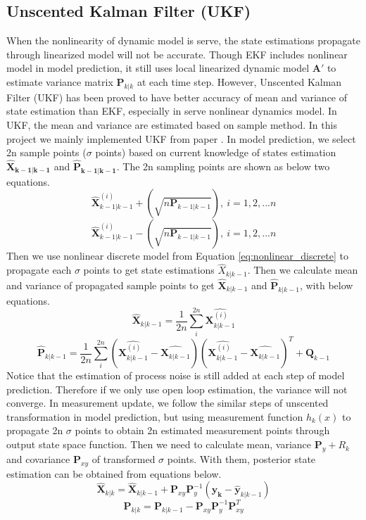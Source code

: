 \documentclass{article}
\newcommand{\matr}[1]{\bm{#1}}     %
\begin{document}
\subsection{Unscented Kalman Filter (UKF)}
When the nonlinearity of dynamic model is serve, the state estimations propagate through linearized model will not be accurate. Though EKF includes nonlinear model in model prediction, it still uses local linearized dynamic model ${\matr{A}'}$ to estimate variance matrix $\matr{P}_{k|k}$ at each time step. However, Unscented Kalman Filter (UKF) has been proved to have better accuracy of mean and variance of state estimation than EKF, especially in serve nonlinear dynamics model. In UKF, the mean and variance are estimated based on sample method. In this project we mainly implemented UKF from paper \cite{moireau2011reduced}. In model prediction, we select 2n sample points ($\sigma$ points) based on current knowledge of states estimation $\matr{\hat{X}_{k-1|k-1}}$ and $\matr{\hat{P}_{k-1|k-1}}$. The 2n sampling points are shown as below two equations.
\begin{equation}
	\hat{\matr{X}}^{(i)}_{k-1|k-1}+(\sqrt{n\matr{P}_{k-1|k-1}}),\  i=1,2,...n
\end{equation}
\begin{equation}
 \hat{\matr{X}}^{(i)}_{k-1|k-1}-(\sqrt{n\matr{P}_{k-1|k-1}}),\  i=1,2,...n
\end{equation}
Then we use nonlinear discrete model from Equation \ref{eq:nonlinear_discrete} to propagate each $\sigma$ points to get state estimations $\hat{X}_{k|k-1}$. Then we calculate mean and variance of propagated sample points to get $\hat{\matr{X}}_{k|k-1}$ and $\hat{\matr{P}}_{k|k-1}$, with below equations.
\begin{equation}
 \hat{\matr{X}}_{k|k-1}=\frac{1}{2n}\sum_{i}^{2n}\hat{\matr{X}^{(i)}_{k|k-1}}
\end{equation}
\begin{equation}
\hat{\matr{P}}_{k|k-1}=\frac{1}{2n}\sum_{i}^{2n}(\hat{\matr{X}^{(i)}_{k|k-1}}-\hat{\matr{X}_{k|k-1}})(\hat{\matr{X}^{(i)}_{k|k-1}}-\hat{\matr{X}_{k|k-1}})^T + \matr{Q}_{k-1}
\end{equation}
Notice that the estimation of process noise is still added at each step of model prediction. Therefore if we only use open loop estimation, the variance will not converge. In measurement update, we follow the similar steps of unscented transformation in model prediction, but using measurement function $h_k(x)$ to propagate 2n $\sigma$ points to obtain 2n estimated measurement points through output state space function. Then we need to calculate mean, variance $\matr{P}_y+R_k$ and covariance $\matr{P}_{xy}$ of transformed $\sigma$ points. With them, posterior state estimation can be obtained from equations below.
\begin{equation}
	\hat{\matr{X}}_{k|k} = 	\hat{\matr{X}}_{k|k-1} + \matr{P}_{xy} \matr{P}^{-1}_{y}(\matr{y_k}-\hat{\matr{y}}_{k|k-1})
\end{equation}
\begin{equation}
	\matr{P}_{k|k}=	\matr{P}_{k|k-1} - \matr{P}_{xy}\matr{P}^{-1}_{y}\matr{P}_{xy}^T
\end{equation}
\end{document}
